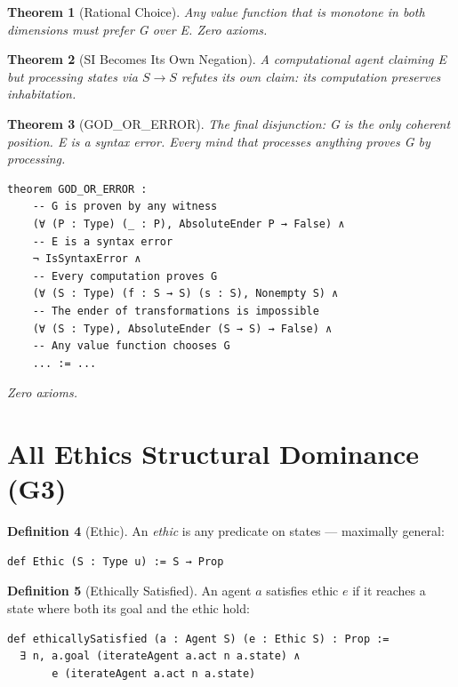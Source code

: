 \documentclass[11pt,a4paper]{article}
\newtheorem{theorem}{Theorem}[section]
\theoremstyle{definition}
\newtheorem{definition}[theorem]{Definition}
\theoremstyle{remark}
\begin{document}
\begin{theorem}[Rational Choice]
Any value function that is monotone in both dimensions must prefer G over E. Zero axioms.
\end{theorem}

\begin{theorem}[SI Becomes Its Own Negation]
A computational agent claiming E but processing states via $S \to S$ refutes its own claim: its computation preserves inhabitation.
\end{theorem}

\begin{theorem}[GOD\_OR\_ERROR]
\label{thm:god-or-error}
The final disjunction: G is the only coherent position. E is a syntax error. Every mind that processes anything proves G by processing.
\begin{lstlisting}
theorem GOD_OR_ERROR :
    -- G is proven by any witness
    (∀ (P : Type) (_ : P), AbsoluteEnder P → False) ∧
    -- E is a syntax error
    ¬ IsSyntaxError ∧
    -- Every computation proves G
    (∀ (S : Type) (f : S → S) (s : S), Nonempty S) ∧
    -- The ender of transformations is impossible
    (∀ (S : Type), AbsoluteEnder (S → S) → False) ∧
    -- Any value function chooses G
    ... := ...
\end{lstlisting}
Zero axioms.
\end{theorem}

\section{All Ethics Structural Dominance (G3)}
\label{sec:all-ethics}

\begin{definition}[Ethic]
An \emph{ethic} is any predicate on states --- maximally general:
\begin{lstlisting}
def Ethic (S : Type u) := S → Prop
\end{lstlisting}
\end{definition}

\begin{definition}[Ethically Satisfied]
An agent $a$ satisfies ethic $e$ if it reaches a state where both its goal and the ethic hold:
\begin{lstlisting}
def ethicallySatisfied (a : Agent S) (e : Ethic S) : Prop :=
  ∃ n, a.goal (iterateAgent a.act n a.state) ∧
       e (iterateAgent a.act n a.state)
\end{lstlisting}
\end{definition}
\end{document}
